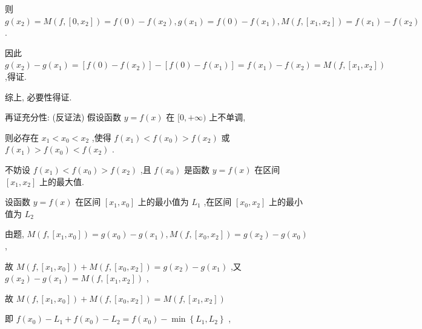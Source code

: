 \documentclass[10pt]{article}
\begin{document}
则 \(g\left( {x}_{2}\right)  = M\left( {f,\left\lbrack  {0,{x}_{2}}\right\rbrack  }\right)  = f\left( 0\right)  - f\left( {x}_{2}\right) , g\left( {x}_{1}\right)  = f\left( 0\right)  - f\left( {x}_{1}\right) , M\left( {f,\left\lbrack  {{x}_{1},{x}_{2}}\right\rbrack  }\right)  = f\left( {x}_{1}\right)  - f\left( {x}_{2}\right)\) .

因此 \(g\left( {x}_{2}\right)  - g\left( {x}_{1}\right)  = \left\lbrack  {f\left( 0\right)  - f\left( {x}_{2}\right) }\right\rbrack   - \left\lbrack  {f\left( 0\right)  - f\left( {x}_{1}\right) }\right\rbrack   = f\left( {x}_{1}\right)  - f\left( {x}_{2}\right)  = M\left( {f,\left\lbrack  {{x}_{1},{x}_{2}}\right\rbrack  }\right)\) ,得证.

综上, 必要性得证.

再证充分性: (反证法) 假设函数 \(y = f\left( x\right)\) 在 \(\lbrack 0, + \infty )\) 上不单调,

则必存在 \({x}_{1} < {x}_{0} < {x}_{2}\) ,使得 \(f\left( {x}_{1}\right) < f\left( {x}_{0}\right) > f\left( {x}_{2}\right)\) 或 \(f\left( {x}_{1}\right)  > f\left( {x}_{0}\right)  < f\left( {x}_{2}\right)\) .

不妨设 \(f\left( {x}_{1}\right) < f\left( {x}_{0}\right) > f\left( {x}_{2}\right)\) ,且 \(f\left( {x}_{0}\right)\) 是函数 \(y = f\left( x\right)\) 在区间 \(\left\lbrack  {{x}_{1},{x}_{2}}\right\rbrack\) 上的最大值.

设函数 \(y = f\left( x\right)\) 在区间 \(\left\lbrack  {{x}_{1},{x}_{0}}\right\rbrack\) 上的最小值为 \({L}_{1}\) ,在区间 \(\left\lbrack  {{x}_{0},{x}_{2}}\right\rbrack\) 上的最小值为 \({L}_{2}\)

由题, \(M\left( {f,\left\lbrack  {{x}_{1},{x}_{0}}\right\rbrack  }\right)  = g\left( {x}_{0}\right)  - g\left( {x}_{1}\right) , M\left( {f,\left\lbrack  {{x}_{0},{x}_{2}}\right\rbrack  }\right)  = g\left( {x}_{2}\right)  - g\left( {x}_{0}\right)\) ,

故 \(M\left( {f,\left\lbrack  {{x}_{1},{x}_{0}}\right\rbrack  }\right)  + M\left( {f,\left\lbrack  {{x}_{0},{x}_{2}}\right\rbrack  }\right)  = g\left( {x}_{2}\right)  - g\left( {x}_{1}\right)\) ,又 \(g\left( {x}_{2}\right)  - g\left( {x}_{1}\right)  = M\left( {f,\left\lbrack  {{x}_{1},{x}_{2}}\right\rbrack  }\right)\) ,

故 \(M\left( {f,\left\lbrack  {{x}_{1},{x}_{0}}\right\rbrack  }\right)  + M\left( {f,\left\lbrack  {{x}_{0},{x}_{2}}\right\rbrack  }\right)  = M\left( {f,\left\lbrack  {{x}_{1},{x}_{2}}\right\rbrack  }\right)\)

即 \(f\left( {x}_{0}\right)  - {L}_{1} + f\left( {x}_{0}\right)  - {L}_{2} = f\left( {x}_{0}\right)  - \min \left\{  {{L}_{1},{L}_{2}}\right\}\) ,
\end{document}
